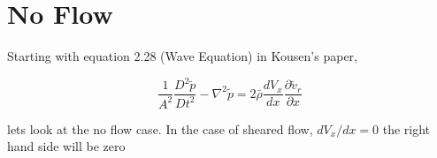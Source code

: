 %
%
%
\section{No Flow}



Starting with equation 2.28 (Wave Equation) in Kousen's paper,



\begin{equation}
    \frac{1}{A^2}\frac{D^2\tilde{p}}{Dt^2} -
    \nabla^2 \tilde{p} =
    2 \bar{\rho} \frac{d V_x}{d x} \frac{\partial  \tilde{v}_r}{ \partial x} 
    \label{eqn:KousensWaveEquation}
\end{equation}


lets look at the no flow case. In the case of sheared flow, $dV_x/dx = 0$ the right hand side will be zero 








